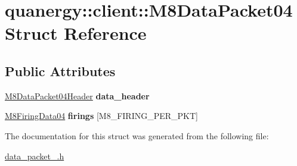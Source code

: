 \hypertarget{structquanergy_1_1client_1_1M8DataPacket04}{\section{quanergy\-:\-:client\-:\-:M8\-Data\-Packet04 Struct Reference}
\label{structquanergy_1_1client_1_1M8DataPacket04}
}
\subsection*{Public Attributes}
\begin{DoxyCompactItemize}
\item 
\hypertarget{structquanergy_1_1client_1_1M8DataPacket04_afc73b943d01a6ad7cc4445ddb6c5d65a}{\hyperlink{structquanergy_1_1client_1_1M8DataPacket04Header}{M8\-Data\-Packet04\-Header} {\bfseries data\-\_\-header}}\label{structquanergy_1_1client_1_1M8DataPacket04_afc73b943d01a6ad7cc4445ddb6c5d65a}

\item 
\hypertarget{structquanergy_1_1client_1_1M8DataPacket04_ab816133b5ada68f42df5a5b895080ddb}{\hyperlink{structquanergy_1_1client_1_1M8FiringData04}{M8\-Firing\-Data04} {\bfseries firings} \mbox{[}M8\-\_\-\-F\-I\-R\-I\-N\-G\-\_\-\-P\-E\-R\-\_\-\-P\-K\-T\mbox{]}}\label{structquanergy_1_1client_1_1M8DataPacket04_ab816133b5ada68f42df5a5b895080ddb}

\end{DoxyCompactItemize}


The documentation for this struct was generated from the following file\-:\begin{DoxyCompactItemize}
\item 
\hyperlink{data__packet__04_8h}{data\-\_\-packet\-\_.\-h}\end{DoxyCompactItemize}
